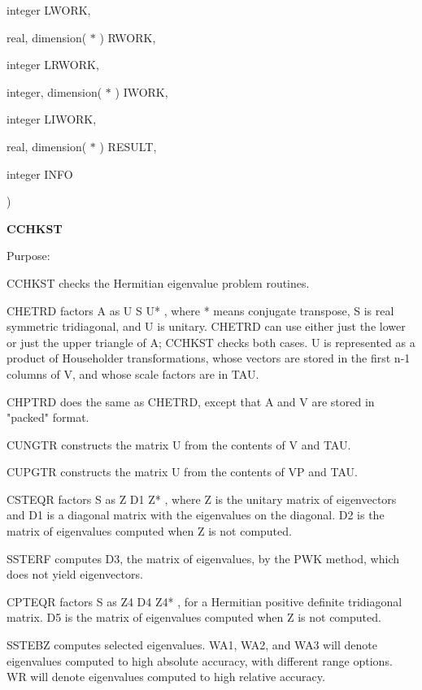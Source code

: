 {\begin{DoxyParamCaption}
\item[{integer}]{L\+W\+O\+R\+K, }
\item[{real, dimension( $\ast$ )}]{R\+W\+O\+R\+K, }
\item[{integer}]{L\+R\+W\+O\+R\+K, }
\item[{integer, dimension( $\ast$ )}]{I\+W\+O\+R\+K, }
\item[{integer}]{L\+I\+W\+O\+R\+K, }
\item[{real, dimension( $\ast$ )}]{R\+E\+S\+U\+L\+T, }
\item[{integer}]{I\+N\+F\+O}
\end{DoxyParamCaption}
)}\label{group__complex__eig_ga525d1a2df6511f9a488f0dd914a45baa}


{\bfseries C\+C\+H\+K\+S\+T} 

\begin{DoxyParagraph}{Purpose\+: }
\begin{DoxyVerb} CCHKST  checks the Hermitian eigenvalue problem routines.

    CHETRD factors A as  U S U* , where * means conjugate transpose,
    S is real symmetric tridiagonal, and U is unitary.
    CHETRD can use either just the lower or just the upper triangle
    of A; CCHKST checks both cases.
    U is represented as a product of Householder
    transformations, whose vectors are stored in the first
    n-1 columns of V, and whose scale factors are in TAU.

    CHPTRD does the same as CHETRD, except that A and V are stored
    in "packed" format.

    CUNGTR constructs the matrix U from the contents of V and TAU.

    CUPGTR constructs the matrix U from the contents of VP and TAU.

    CSTEQR factors S as  Z D1 Z* , where Z is the unitary
    matrix of eigenvectors and D1 is a diagonal matrix with
    the eigenvalues on the diagonal.  D2 is the matrix of
    eigenvalues computed when Z is not computed.

    SSTERF computes D3, the matrix of eigenvalues, by the
    PWK method, which does not yield eigenvectors.

    CPTEQR factors S as  Z4 D4 Z4* , for a
    Hermitian positive definite tridiagonal matrix.
    D5 is the matrix of eigenvalues computed when Z is not
    computed.

    SSTEBZ computes selected eigenvalues.  WA1, WA2, and
    WA3 will denote eigenvalues computed to high
    absolute accuracy, with different range options.
    WR will denote eigenvalues computed to high relative
    accuracy.


\end{DoxyVerb}
\end{DoxyParagraph}
